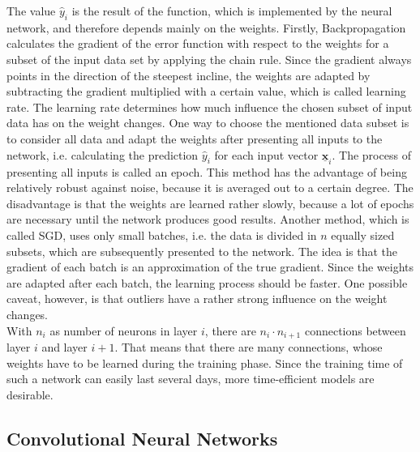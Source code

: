 \documentclass[11pt, a4paper]{article}
\newcommand\V[1]{\ensuremath{\underline{\mathbf{#1}}}}
\begin{document}
The value $\hat{y}_i$ is the result of the function, which is implemented by the neural network, and therefore depends mainly on the weights. Firstly, Backpropagation calculates the gradient of the error function with respect to the weights for a subset of the input data set by applying the chain rule. Since the gradient always points in the direction of the steepest incline, the weights are adapted by subtracting the gradient multiplied with a certain value, which is called learning rate. The learning rate determines how much influence the chosen subset of input data has on the weight changes. One way to choose the mentioned data subset is to consider all data and adapt the weights after presenting all inputs to the network, i.e. calculating the prediction $\hat{y}_i$ for each input vector $\V{x}_i$. The process of presenting all inputs is called an epoch. This method has the advantage of being relatively robust against noise, because it is averaged out to a certain degree. The disadvantage is that the weights are learned rather slowly, because a lot of epochs are necessary until the network produces good results. Another method, which is called \acf{SGD}, uses only small batches, i.e. the data is divided in $n$ equally sized subsets, which are subsequently presented to the network. The idea is that the gradient of each batch is an approximation of the true gradient. Since the weights are adapted after each batch, the learning process should be faster. One possible caveat, however, is that outliers have a rather strong influence on the weight changes.\\
With $n_i$ as number of neurons in layer $i$, there are $n_i \cdot n_{i+1}$ connections between layer $i$ and layer $i+1$. That means that there are many connections, whose weights have to be learned during the training phase. Since the training time of such a network can easily last several days, more time-efficient models are desirable.

\subsection{Convolutional Neural Networks}
\end{document}
